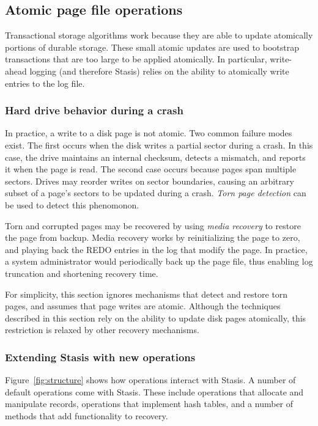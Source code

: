 \documentclass[letterpaper,twocolumn,10pt]{article}
\newcommand{\yad}{Stasis\xspace}
\begin{document}
\subsection{Atomic page file operations}

Transactional storage algorithms work because they are able to
update atomically portions of durable storage.  These small atomic
updates are used to bootstrap transactions that are too large to be
applied atomically.  In particular, write-ahead logging (and therefore
\yad) relies on the ability to atomically write entries to the log
file.

\subsubsection{Hard drive behavior during a crash}
In practice, a write to a disk page is not atomic.  Two common failure
modes exist.  The first occurs when the disk writes a partial sector
during a crash.  In this case, the drive maintains an internal
checksum, detects a mismatch, and reports it when the page is read.
The second case occurs because pages span multiple sectors.  Drives
may reorder writes on sector boundaries, causing an arbitrary subset
of a page's sectors to be updated during a crash.  {\em Torn page
detection} can be used to detect this phenomonon.

Torn
and corrupted pages may be recovered by using {\em media recovery} to
restore the page from backup.  Media recovery works by reinitializing
the page to zero, and playing back the REDO entries in the log that
modify the page.  In practice, a system administrator would
periodically back up the page file, thus enabling log truncation and
shortening recovery time.

For simplicity, this section ignores mechanisms that detect
and restore torn pages, and assumes that page writes are atomic.
Although the techniques described in this section rely on the ability to
update disk pages atomically, this restriction is relaxed by other 
recovery mechanisms.


\subsubsection{Extending \yad with new operations}

Figure~\ref{fig:structure} shows how operations interact with \yad.  A
number of default operations come with \yad.  These include operations
that allocate and manipulate records, operations that implement hash
tables, and a number of methods that add functionality to recovery.
\end{document}
